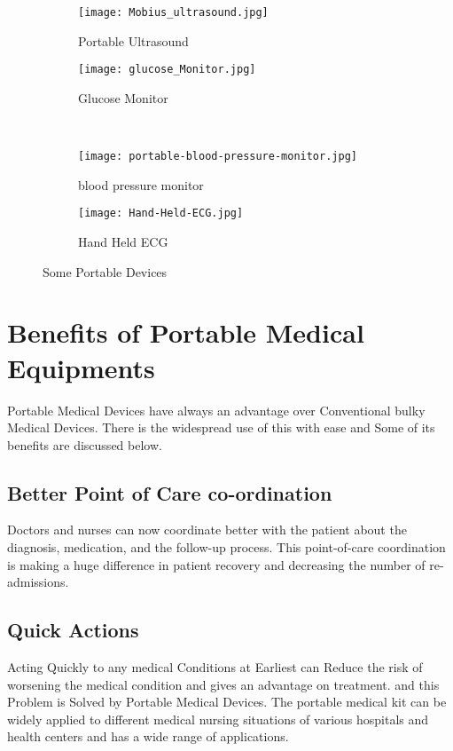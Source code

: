 \documentclass[12pt]{article}
\begin{document}
\begin{figure}[h]
\centering
\begin{subfigure}[l]{0.4\textwidth}
	\centering 
    \texttt{[image: Mobius\_ultrasound.jpg]}
    \caption{Portable Ultrasound}
    \label{Fig_Ultrasound}
\end{subfigure}
\hspace{2cm}
\begin{subfigure}[r]{0.4\textwidth}
	\centering
	 \texttt{[image: glucose\_Monitor.jpg]}
    \caption{Glucose Monitor}
    \label{Fig_Glucose-monitor}
\end{subfigure}
\\
\begin{subfigure}[l]{0.4\textwidth}
	\centering 
    \texttt{[image: portable-blood-pressure-monitor.jpg]}
    \caption{blood pressure monitor}
    \label{Fig_blood-pressure-monitor}
\end{subfigure}
\hspace{2cm}
\begin{subfigure}[r]{0.4\textwidth}
	\centering
	 \texttt{[image: Hand-Held-ECG.jpg]}
    \caption{Hand Held ECG}
    \label{Fig_Hand-Held-ECG}
\end{subfigure}
\caption{Some Portable Devices}
\end{figure}

\section{Benefits of Portable Medical Equipments}
 Portable Medical Devices have always an advantage over Conventional bulky Medical Devices. There is the widespread use of this with ease and Some of its benefits are discussed below.
\subsection{Better Point of Care co-ordination}  Doctors and nurses can now coordinate better with the patient about the diagnosis, medication, and the follow-up process. This point-of-care coordination is making a huge difference in patient recovery and decreasing the number of re-admissions. 
\cite{Kathooria:2017}
\subsection{Quick Actions}
Acting Quickly to any medical Conditions at Earliest can Reduce the risk of worsening the medical condition and gives an advantage on treatment. and this Problem is Solved by Portable Medical Devices. The portable medical kit can be widely applied to different medical nursing situations of various hospitals and health centers and has a wide range of applications.
\end{document}
